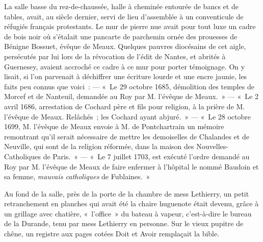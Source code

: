 \documentclass[french,twoside]{book} %
\begin{document}
La salle basse du rez-de-chaussée, halle à cheminée entourée de bancs et de tables, avait, au siècle dernier, servi de lieu d’assemblée à un conventicule de réfugiés français protestants. Le mur de pierre nue avait pour tout luxe un cadre de bois noir où s’étalait une pancarte de parchemin ornée des prouesses de Bénigne Bossuet, évêque de Meaux. Quelques pauvres diocésains de cet aigle, persécutés par lui lors de la révocation de l’édit de Nantes, et abrités à Guernesey, avaient accroché ce cadre à ce mur pour porter témoignage. On y lisait, si l’on parvenait à déchiffrer une écriture lourde et une encre jaunie, les faits peu connus que voici : — « Le 29 octobre 1685, démolition des temples de Morcef et de Nanteuil, demandée au Roy par M. l’évêque de Meaux. » — « Le 2 avril 1686, arrestation de Cochard père et fils pour religion, à la prière de M. l’évêque de Meaux. Relâchés ; les Cochard  ayant abjuré. » — « Le 28 octobre 1699, M. l’évêque de Meaux envoie à M. de Pontchartrain un mémoire remontrant qu’il serait nécessaire de mettre les demoiselles de Chalandes et de Neuville, qui sont de la religion réformée, dans la maison des Nouvelles-Catholiques de Paris. » — « Le 7 juillet 1703, est exécuté l’ordre demandé au Roy par M. l’évêque de Meaux de faire enfermer à l’hôpital le nommé Baudoin et sa femme, \emph{mauvais catholiques} de Fublaines. »\par
Au fond de la salle, près de la porte de la chambre de mess Lethierry, un petit retranchement en planches qui avait été la chaire huguenote était devenu, grâce à un grillage avec chatière, « l’office » du bateau à vapeur, c’est-à-dire le bureau de la Durande, tenu par mess Lethierry en personne. Sur le vieux pupitre de chêne, un registre aux pages cotées Doit et Avoir remplaçait la bible.
\end{document}
